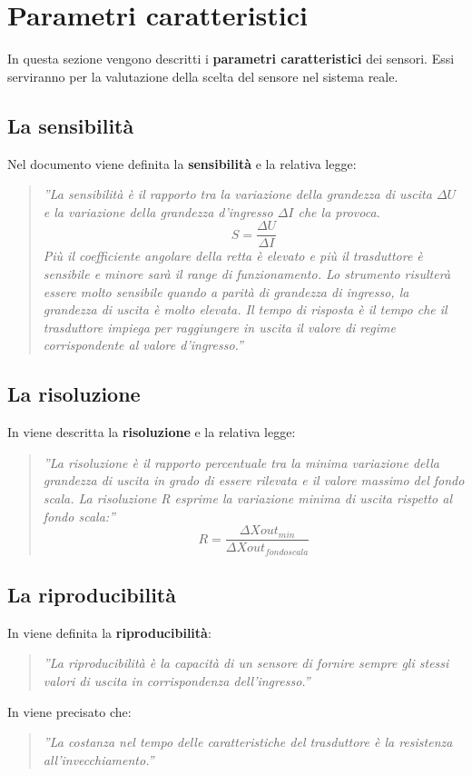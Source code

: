 \documentclass[a4paper]{report} %
\begin{document}
\section{Parametri caratteristici}
In questa sezione vengono descritti i \textbf{parametri caratteristici} dei sensori. Essi serviranno per la valutazione della scelta del sensore nel sistema reale.
\subsection{La sensibilità}
Nel documento \cite{art:rif.11} viene definita la \textbf{sensibilità} e la relativa legge:
\begin{quote}
	\textit{''La sensibilità è il rapporto tra la variazione della grandezza di uscita $\Delta U$ e la variazione della grandezza d'ingresso $\Delta I$ che la provoca. 
	\begin{equation}
	S = \frac{\Delta U}{\Delta I}
	\end{equation}
	Più il coefficiente angolare della retta è elevato e più il trasduttore è sensibile e minore sarà il range di funzionamento. Lo strumento risulterà essere molto sensibile quando a parità di grandezza di ingresso, la grandezza di uscita è molto elevata. Il tempo di risposta è il tempo che il trasduttore impiega per raggiungere in uscita il valore di regime corrispondente al valore d'ingresso.''}
\end{quote}
 
\subsection{La risoluzione}
In \cite{art:rif.11} viene descritta la \textbf{risoluzione} e la relativa legge:
\begin{quote}
	\textit{''La risoluzione è il rapporto percentuale tra la minima variazione della grandezza di uscita in grado di essere rilevata e il valore massimo del fondo scala.
	La risoluzione R esprime la variazione minima di uscita rispetto al fondo scala:''}
	\begin{equation}
	R = \frac{\Delta Xout_{min}}{\Delta Xout_{fondo scala}}
	\end{equation}
\end{quote}
 
\subsection{La riproducibilità}
In \cite{art:rif.11} viene definita la \textbf{riproducibilità}:
\begin{quote}
	\textit{''La riproducibilità è la capacità di un sensore di fornire sempre gli stessi valori di uscita in corrispondenza dell'ingresso.''} 
\end{quote}
In \cite{art:rif.17} viene precisato che:
\begin{quote}
	\textit{''La costanza nel tempo delle caratteristiche del trasduttore è la resistenza all'invecchiamento.''}
\end{quote}
 
\end{document}
